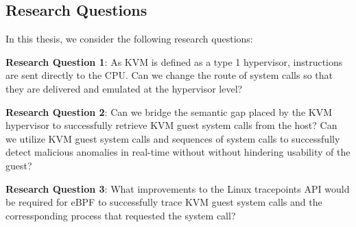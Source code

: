 \documentclass{report}
\begin{document}
\begin{spacing}{1.5}
\chapter{Research Questions}

{\large
In this thesis, we consider the following research questions:
\newline
}

{\large
\textbf{Research Question 1}: As KVM is defined as a type 1 hypervisor, instructions are sent directly to the CPU. Can we change the route of system calls so that they are delivered and emulated at the hypervisor level?
\newline
}

{\large
\textbf{Research Question 2}: Can we bridge the semantic gap placed by the KVM hypervisor to successfully retrieve KVM guest system calls from the host? Can we utilize KVM guest system calls and sequences of system calls to successfully detect malicious anomalies in real-time without without hindering usability of the guest?
\newline
}

{\large
\textbf{Research Question 3}: What improvements to the Linux tracepoints API would be required for eBPF to successfully trace KVM guest system calls and the corressponding process that requested the system call?
\newline
}









\end{spacing}
\end{document}
